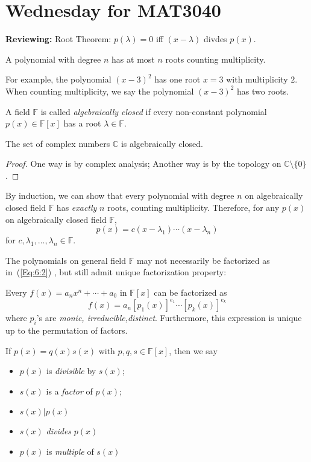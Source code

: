 
\section{Wednesday for MAT3040}
\textbf{Reviewing: }Root Theorem: $p(\lambda)=0$ iff $(x-\lambda)$ divdes $p(x)$.
\begin{corollary}
A polynomial with degree $n$ has at most $n$ roots counting multiplicity.
\end{corollary}
For example, the polynomial $(x-3)^2$ has one root $x=3$ with multiplicity $2$. When counting multiplicity, we say the polynomial $(x-3)^2$ has two roots.

\begin{definition}
A field $\mathbb{F}$ is called \emph{algebraically closed} if every non-constant polynomial $p(x)\in\mathbb{F}[x]$ has a root $\lambda\in \mathbb{F}$.
\end{definition}
\begin{theorem}
The set of complex numbers $\mathbb{C}$ is algebraically closed.
\end{theorem}
\begin{proof}
One way is by complex analysis; Another way is by the topology on $\mathbb{C}\setminus\{0\}$.
\end{proof}
\begin{remark}
By induction, we can show that every polynomial with degree $n$ on algebraically closed field $\mathbb{F}$ has \emph{exactly} $n$ roots, counting multiplicity.
Therefore, for any $p(x)$ on algebraically closed field $\mathbb{F}$,
\begin{equation}\label{Eq:6:2}
p(x) = c(x-\lambda_1)\cdots(x-\lambda_n)
\end{equation}
for $c,\lambda_1,\dots,\lambda_n\in\mathbb{F}$.
\end{remark}
The polynomials on general field $\mathbb{F}$ may not necessarily be factorized as in~(\ref{Eq:6:2}) , but still admit unique factorization property:
\begin{theorem}
Every $f(x) = a_nx^n+\cdots+a_0$ in $\mathbb{F}[x]$ can be factorized as
\[
f(x) = a_n[p_1(x)]^{e_1}\cdots[p_k(x)]^{e_k}
\]
where $p_i$'s are \emph{monic, irreducible,distinct}. Furthermore, this expression is unique up to the permutation of factors.
\end{theorem}

\begin{definition}[Factor]
If $p(x) = q(x)s(x)$ with $p,q,s\in\mathbb{F}[x]$, then we say
\begin{itemize}
\item
$p(x)$ is \emph{divisible} by $s(x)$;
\item
$s(x)$ is a \emph{factor} of $p(x)$;
\item
$s(x)|p(x)$
\item
$s(x)$ \emph{divides} $p(x)$
\item
$p(x)$ is \emph{multiple} of $s(x)$
\end{itemize}
\end{definition}

